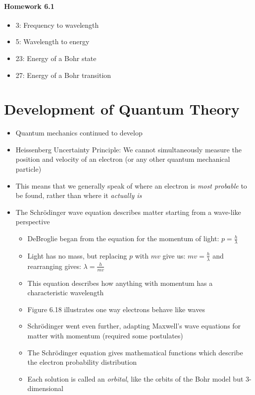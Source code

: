 \documentclass[12pt, openany, letterpaper]{memoir}
\begin{document}
\paragraph*{Homework 6.1}
\begin{itemize}
  \item 3: Frequency to wavelength
  \item 5: Wavelength to energy
  \item 23: Energy of a Bohr state
  \item 27: Energy of a Bohr transition
\end{itemize}

\section{Development of Quantum Theory}
\begin{itemize}
	\item Quantum mechanics continued to develop
	\item Heissenberg Uncertainty Principle: We cannot simultaneously measure the position and velocity of an electron (or any other quantum mechanical particle)
	\item This means that we generally speak of where an electron is \emph{most probable} to be found, rather than where it \emph{actually is}
	\item The Schr\"odinger wave equation describes matter starting from a wave-like perspective
	      \begin{itemize}
          \item DeBroglie began from the equation for the momentum of light: $p=\frac{h}{\lambda}$
          \item Light has no mass, but replacing $p$ with $mv$ give us: $mv = \frac{h}{\lambda}$ and rearranging gives: $\lambda=\frac{h}{mv}$
          \item This equation describes how anything with momentum has a characteristic wavelength
          \item Figure 6.18 illustrates one way electrons behave like waves
          \item Schr\"odinger went even further, adapting Maxwell's wave equations for matter with momentum (required some postulates)
		      \item The Schr\"odinger equation gives mathematical functions which describe the electron probability distribution
		      \item Each solution is called an \emph{orbital}, like the orbits of the Bohr model but 3-dimensional

\end{itemize}
\end{itemize}
\end{document}
